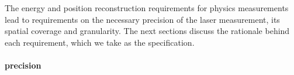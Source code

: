 




The energy and position reconstruction requirements for physics measurements lead to requirements on the necessary precision of the laser %
\efield measurement, its spatial coverage and granularity. The next sections discuss the rationale behind each requirement, which we take as the  specification.

\paragraph{\efield precision}

